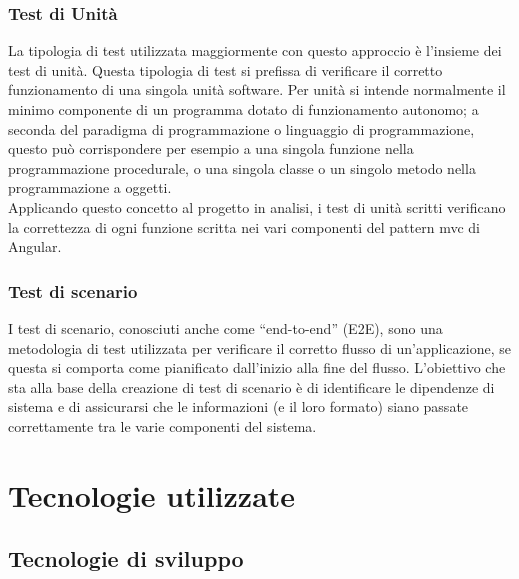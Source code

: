 \subsubsection{Test di Unità}
La tipologia di test utilizzata maggiormente con questo approccio è l'insieme dei test di unità. Questa tipologia di test si prefissa di verificare il corretto funzionamento di una singola unità software. Per unità si intende normalmente il minimo componente di un programma dotato di funzionamento autonomo; a seconda del paradigma di programmazione o linguaggio di programmazione, questo può corrispondere per esempio a una singola funzione nella programmazione procedurale, o una singola classe o un singolo metodo nella programmazione a oggetti.\\
Applicando questo concetto al progetto in analisi, i test di unità scritti verificano la correttezza di ogni funzione scritta nei vari componenti del pattern \gls{mvc} di Angular. 

\subsubsection{Test di scenario}
I test di scenario, conosciuti anche come “end-to-end” (E2E), sono una metodologia di test utilizzata per verificare il corretto flusso di un’applicazione, se questa si comporta come pianificato dall’inizio alla fine del flusso. L’obiettivo che sta alla base della creazione di test di scenario è di identificare  le dipendenze di sistema e di assicurarsi che le informazioni (e il loro formato) siano passate correttamente tra le varie componenti del sistema.


\section{Tecnologie utilizzate}
\subsection{Tecnologie di sviluppo}
